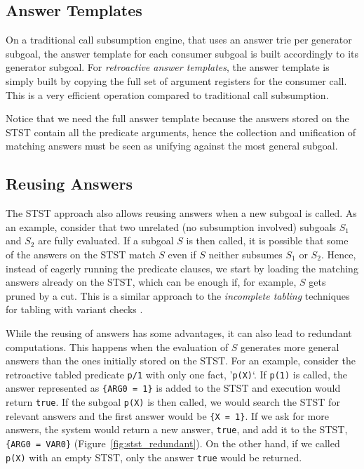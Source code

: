 \subsection{Answer Templates}

On a traditional call subsumption engine, that uses an answer trie per generator subgoal,
the answer template for each consumer subgoal is built accordingly to its generator subgoal.
For \textit{retroactive answer templates}, the answer template is simply built by copying
the full set of argument registers for the consumer call. This is a very efficient operation
compared to traditional call subsumption.

Notice that we need the full answer template because the answers stored on the STST contain
all the predicate arguments, hence the collection and unification of matching answers must be
seen as unifying against the most general subgoal.

\subsection{Reusing Answers}

The STST approach also allows reusing answers when a new subgoal is called.
As an example, consider that two unrelated (no subsumption involved) subgoals $S_1$
and $S_2$ are fully evaluated. If a subgoal $S$ is then called, it is possible
that some of the answers on the STST match $S$ even if $S$ neither subsumes
$S_1$ or $S_2$. Hence, instead of eagerly running the predicate clauses, we start
by loading the matching answers already on the STST, which can be enough if,
for example, $S$ gets pruned by a cut. This is a similar approach to the \textit{incomplete
tabling} techniques for tabling with variant checks \cite{Rocha-06a}.

While the reusing of answers has some advantages, it can also lead to redundant computations.
This happens when the evaluation of $S$ generates more general answers than the ones initially
stored on the STST. For an example, consider the retroactive
tabled predicate \texttt{p/1} with only one fact, '\texttt{p(X)}`. If \texttt{p(1)} is
called, the answer represented as \texttt{\{ARG0~=~1\}} is added to the STST and execution
would return \texttt{true}. If the subgoal \texttt{p(X)} is then called, we would search
the STST for relevant answers and the first answer would be \texttt{\{X~=~1\}}. If we
ask for more answers, the system would return a new answer, \texttt{true}, and add it
to the STST, \texttt{\{ARG0~=~VAR0\}} (Figure~\ref{fig:stst_redundant}). On the other hand,
if we called \texttt{p(X)} with an empty STST, only the answer \texttt{true} would be returned.

